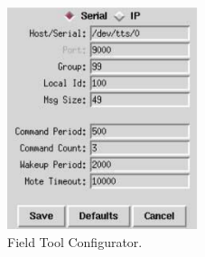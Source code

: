 \documentclass{article}
\begin{document}
\begin{figure}[t]
\begin{center}
\includegraphics[width=2.2in]{./fig/fieldtool-config.pdf}
\end{center}
\caption{Field Tool Configurator.}
\label{fig:configview}
\end{figure}
\end{document}
